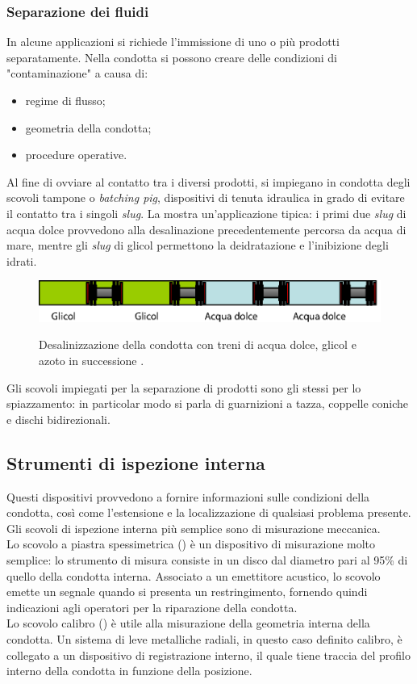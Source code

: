 \subsubsection{Separazione dei fluidi}
In alcune applicazioni si richiede l'immissione di uno o più prodotti separatamente. Nella condotta si possono creare delle condizioni di "contaminazione" a causa di:
\begin{itemize}
	\item regime di flusso;
	\item geometria della condotta;
	\item procedure operative.
\end{itemize}
Al fine di ovviare al contatto tra i diversi prodotti, si impiegano in condotta degli scovoli tampone o \textit{batching pig}, dispositivi di tenuta idraulica in grado di evitare il contatto tra i singoli \textit{slug}. La  mostra un'applicazione tipica: i primi due \textit{slug} di acqua dolce provvedono alla desalinazione precedentemente percorsa da acqua di mare, mentre gli \textit{slug} di glicol permettono la deidratazione e l'inibizione degli idrati.

\begin{figure}[htbp]
	\centering
	\includegraphics[width=\textwidth]{fig/pig/batching.eps}
	\label{fig:batching}
	\caption{Desalinizzazione della condotta con treni di acqua dolce, glicol e azoto in successione \parencite{davidson2002introduction}.}
\end{figure}

Gli scovoli impiegati per la separazione di prodotti sono gli stessi per lo spiazzamento: in particolar modo si parla di guarnizioni a tazza, coppelle coniche e dischi bidirezionali.

\subsection{Strumenti di ispezione interna}
Questi dispositivi provvedono a fornire informazioni sulle condizioni della condotta, così come l'estensione e la localizzazione di qualsiasi problema presente. Gli scovoli di ispezione interna più semplice sono di misurazione meccanica.\\
Lo scovolo a piastra spessimetrica () è un dispositivo di misurazione molto semplice: lo strumento di misura consiste in un disco dal diametro pari al 95\% di quello della condotta interna. Associato a un emettitore acustico, lo scovolo emette un segnale quando si presenta un restringimento, fornendo quindi indicazioni agli operatori per la riparazione della condotta. \\
Lo scovolo calibro () è utile alla misurazione della geometria interna della condotta. Un sistema di leve metalliche radiali, in questo caso definito calibro, è collegato a un dispositivo di registrazione interno, il quale tiene traccia del profilo interno della condotta in funzione della posizione. 

